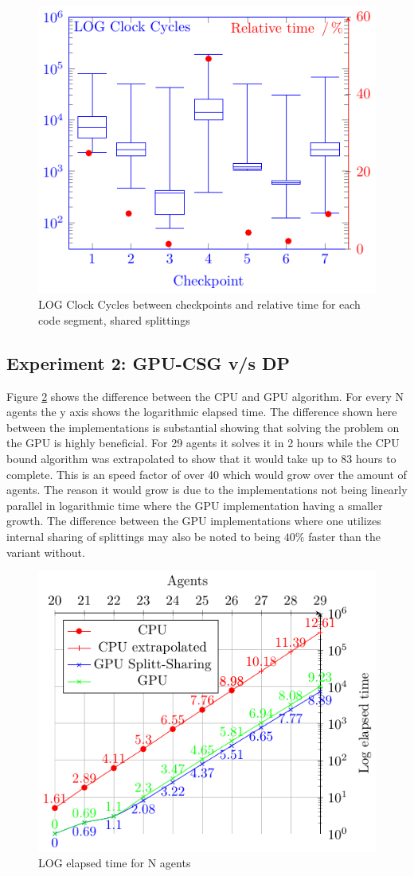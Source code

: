 \documentclass{llncs}
\begin{document}
\begin{figure}[htbp]\centering
\includegraphics[width=0.8\columnwidth]{fig2cycles}
\caption{LOG Clock Cycles between checkpoints and relative time for each code segment, shared splittings\label{splitt}}
\end{figure}

\subsection{Experiment 2: GPU-CSG v/s DP}
Figure \ref{time} shows the difference between the CPU and GPU algorithm.
For every N agents the y axis shows the logarithmic elapsed time. The difference shown here between the implementations is substantial showing
that solving the problem on the GPU is highly beneficial. For 29 agents it solves it in 2 hours while the CPU bound algorithm was extrapolated to show that it would take up to 83 hours to complete. This is an speed factor of over 40 which would grow over the amount of agents. The reason it would grow is due to the implementations not being linearly parallel in logarithmic time where the GPU implementation having a smaller growth.
The difference between the GPU implementations where one utilizes internal 
sharing of splittings may also be noted to being $40\%$ faster than the variant without.

\begin{figure}[htbp]\centering
\includegraphics[width=0.8\columnwidth]{fig1cycles}
\caption{LOG elapsed time for N agents\label{time}}
\end{figure}
\end{document}
